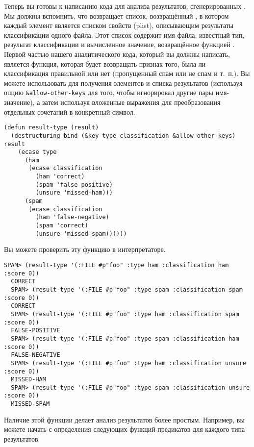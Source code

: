 Теперь вы готовы к написанию кода для анализа результатов, сгенерированных
.  Мы должны вспомнить, что  возвращает
список, возвращённый , в котором каждый элемент является списком
свойств (plist), описывающим результаты классификации одного файла.  Этот список содержит
имя файла, известный тип, результат классификации и вычисленное значение, возвращённое
функцией .  Первой частью нашего аналитического кода, который вы должны
написать, является функция, которая будет возвращать признак того, была ли классификация
правильной или нет (пропущенный спам или не спам и т.~п.).  Вы можете использовать
 для получения элементов  и 
списка результатов (используя опцию \lstinline!&allow-other-keys! для того, чтобы
 игнорировал другие пары имя-значение), а затем используя
вложенные выражения  для преобразования отдельных сочетаний в конкретный
символ.

\begin{lstlisting}
(defun result-type (result)
  (destructuring-bind (&key type classification &allow-other-keys) result
    (ecase type
      (ham
       (ecase classification
         (ham 'correct)
         (spam 'false-positive)
         (unsure 'missed-ham)))
      (spam
       (ecase classification
         (ham 'false-negative)
         (spam 'correct)
         (unsure 'missed-spam))))))
\end{lstlisting}

Вы можете проверить эту функцию в интерпретаторе.

\begin{lstlisting}[style=lisprepl]
  SPAM> (result-type '(:FILE #p"foo" :type ham :classification ham :score 0))
  CORRECT
  SPAM> (result-type '(:FILE #p"foo" :type spam :classification spam :score 0))
  CORRECT
  SPAM> (result-type '(:FILE #p"foo" :type ham :classification spam :score 0))
  FALSE-POSITIVE
  SPAM> (result-type '(:FILE #p"foo" :type spam :classification ham :score 0))
  FALSE-NEGATIVE
  SPAM> (result-type '(:FILE #p"foo" :type ham :classification unsure :score 0))
  MISSED-HAM
  SPAM> (result-type '(:FILE #p"foo" :type spam :classification unsure :score 0))
  MISSED-SPAM
\end{lstlisting}

Наличие этой функции делает анализ результатов  более простым.
Например, вы можете начать с определения следующих функций-предикатов для каждого типа
результатов.

